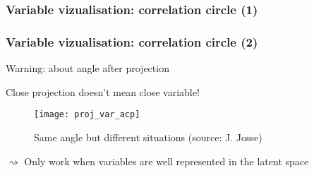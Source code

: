 \begin{frame}[fragile]
  \frametitle{Variable vizualisation: correlation circle (1)}

\begin{knitrout}
\color{fgcolor}\begin{kframe}
\begin{alltt}
\end{alltt}


{\ttfamily\noindent\bfseries{}}\end{kframe}
\end{knitrout}

\end{frame}

\begin{frame}[fragile]
  \frametitle{Variable vizualisation: correlation circle (2)}

\begin{knitrout}
\color{fgcolor}\begin{kframe}
\begin{alltt}
  \hlstd{=} \hlstd{(}\hlstd{,}\hlstd{))}
\end{alltt}


{\ttfamily\noindent\bfseries{}}\end{kframe}
\end{knitrout}

\end{frame}

\begin{frame}{Warning: about angle after projection}

  \alert{Close projection doesn't mean close variable!}

  \begin{figure}
    \texttt{[image: proj\_var\_acp]}
    \caption{Same angle but different situations {\tiny (source: J. Josse)}}

  \end{figure}

 $\rightsquigarrow$ Only work when variables are well represented in the latent space
\end{frame}

